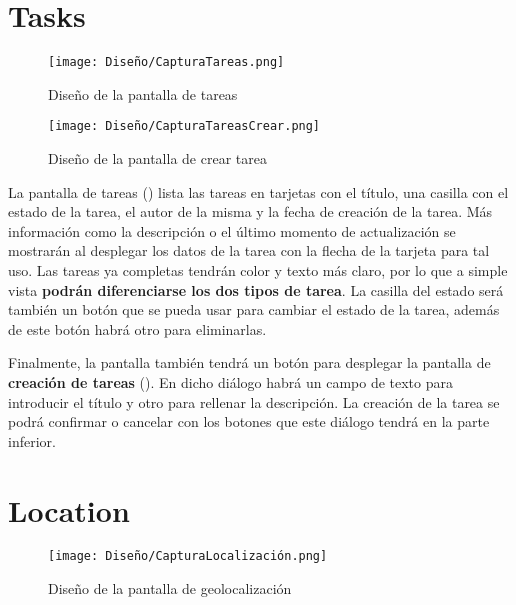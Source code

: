 \section{Tasks}

\begin{figure}[H]
    \centering
    \begin{minipage}{0.45\textwidth}
        \centering
        \texttt{[image: Diseño/CapturaTareas.png]}
        \caption{Diseño de la pantalla de tareas}
        \label{scr:task}
    \end{minipage}\hfill
    \begin{minipage}{0.45\textwidth}
        \centering
        \texttt{[image: Diseño/CapturaTareasCrear.png]}
        \caption{Diseño de la pantalla de crear tarea}
        \label{scr:task_crear}
    \end{minipage}\hfill
\end{figure}

La pantalla de tareas () lista las tareas en tarjetas con el título, una casilla con el estado de la tarea, el autor de la misma y la fecha de creación de la tarea. Más información como la descripción o el último momento de actualización se mostrarán al desplegar los datos de la tarea con la flecha de la tarjeta para tal uso. Las tareas ya completas tendrán color y texto más claro, por lo que a simple vista \textbf{podrán diferenciarse los dos tipos de tarea}. La casilla del estado será también un botón que se pueda usar para cambiar el estado de la tarea, además de este botón habrá otro para eliminarlas. 

Finalmente, la pantalla también tendrá un botón para desplegar la pantalla de \textbf{creación de tareas} (). En dicho diálogo habrá un campo de texto para introducir el título y otro para rellenar la descripción. La creación de la tarea se podrá confirmar o cancelar con los botones que este diálogo tendrá en la parte inferior.

\section{Location}

\begin{figure}[H]
    \centering
    \texttt{[image: Diseño/CapturaLocalización.png]}
    \caption{Diseño de la pantalla de geolocalización}
    \label{scr:location}
\end{figure}

